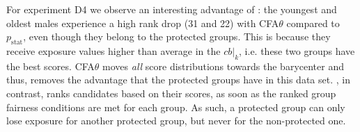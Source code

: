 For experiment D4 we observe an interesting advantage of \algoFAIR: the youngest and oldest males experience a high rank drop (31 and 22) with CFA$\theta$ compared to \algoFAIR $p_{\text{stat}}$, even though they belong to the protected groups.
%
This is because they receive exposure values higher than average in the $cb|_k$, i.e. these two groups have the best scores.
%
CFA$\theta$ moves \emph{all} score distributions towards the barycenter and thus, removes the advantage that the protected groups have in this data set.
%
\algoFAIR, in contrast, ranks candidates based on their scores, as soon as the ranked group fairness conditions are met for each group.
%
As such, a protected group can only lose exposure for another protected group, but never for the non-protected one.
